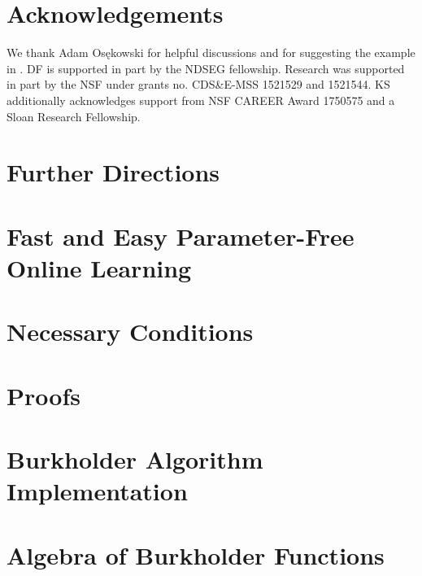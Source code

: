 \documentclass[final,12pt]{colt2018}
\newcommand{\Bfun}{Burkholder }
\begin{document}
\section*{Acknowledgements}
We thank Adam Os\k{e}kowski  for helpful discussions and for suggesting the example in .  DF is supported in part by the NDSEG fellowship. Research was supported in part by the NSF under grants no. CDS\&E-MSS 1521529 and 1521544. KS additionally acknowledges support from NSF CAREER Award 1750575 and a Sloan Research Fellowship.



\appendix

\section{Further Directions}
\label{app:discussion}


\section{Fast and Easy Parameter-Free Online Learning}
\label{app:linear_loss}


\section{Necessary Conditions}
\label{app:necessary}



\section{Proofs}
\label{app:proofs}




\section{Burkholder Algorithm Implementation}
\label{app:efficient}



\section{Algebra of \Bfun Functions}
\label{app:algebra}



  
\end{document}

